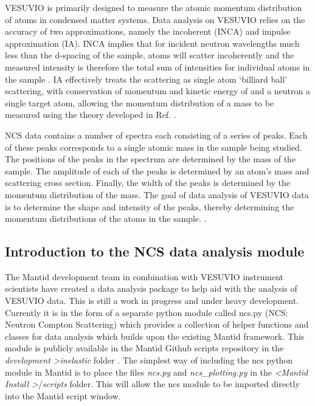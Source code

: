 \documentclass[paper=a4, fontsize=11pt]{scrartcl}	%
\numberwithin{equation}{section}															%
\numberwithin{figure}{section}																%
\numberwithin{table}{section}
\begin{document}
VESUVIO is primarily designed to measure the atomic momentum distribution of atoms in condensed matter systems. Data analysis on VESUVIO relies on the accuracy of two approximations, namely the incoherent (INCA) and impulse approximation (IA). INCA implies that for incident neutron wavelengths much less than the d-spacing of the sample, atoms will scatter incoherently and the measured intensity is
therefore the total sum of intensities for individual atoms in the sample \cite{fernandezalonso2013neutron}. IA effectively treats the scattering as single atom `billiard ball' scattering, with conservation of momentum and kinetic energy of and a neutron a single target atom, allowing the momentum distribution of a mass to be measured using the theory developed in Ref. \cite{mayers2012vesuvio}. 

NCS data contains a number of spectra each consisting of a series of peaks. Each of these peaks corresponds to a single atomic mass in the sample being studied. The positions of the peaks in the spectrum are determined by the mass of the sample. The amplitude of each of the peaks is determined by an atom's mass and scattering cross section. Finally, the width of the peaks is determined by the momentum distribution of the mass. The goal of data analysis of VESUVIO data is to determine the shape and intensity of the peaks, thereby determining the momentum distributions of the atoms in the sample. \cite{mayers2010user}.

\subsection{Introduction to the NCS data analysis module}
\label{subsec:intro-data-analysis}
The Mantid development team in combination with VESUVIO instrument scientists have created a data analysis package to help aid with the analysis of VESUVIO data. This is still a work in progress and under heavy development. Currently it is in the form of a separate python module called ncs.py (NCS: Neutron Compton Scattering) which provides a collection of helper functions and classes for data analysis which builds upon the existing Mantid framework. This module is publicly available in the Mantid Github scripts repository in the \textit{development \textgreater  inelastic} folder \cite{mantidgithubncs}. The simplest way of including the ncs python module in Mantid is to place the files \textit{ncs.py} and \textit{ncs\_plotting.py} in the \textit{ \textless Mantid Install \textgreater }/\textit{scripts} folder. This will allow the ncs module to be imported directly into the Mantid script window.
\end{document}
